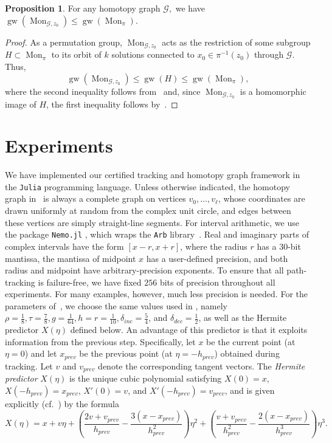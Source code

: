 \documentclass[11pt]{amsart}
\let\oldtextit\textit
\renewcommand\emph[1]{\oldtextit{\color{blue}#1}}
\theoremstyle{definition}
\newtheorem{proposition}[definition]{Proposition}
\theoremstyle{remark}
\DeclareMathOperator{\Mon}{Mon}
\DeclareMathOperator{\gw}{gw}
\begin{document}
\begin{proposition}\label{prop:galois-width}
For any homotopy graph $\mathcal{G},$ we have $\gw (\Mon_{\mathcal{G},z_0} )\le \gw(\Mon_\pi)$.
\end{proposition}
\begin{proof}
As a permutation group, $\Mon_{\mathcal{G},z_0}$ 
acts as the restriction of some subgroup
$H\subset \Mon_\pi$ to its orbit of $k$ solutions connected to $x_0\in\pi^{-1} (z_0)$ through $\mathcal{G}.$
Thus,
$$\gw (\Mon_{\mathcal{G},z_0}) \le \gw (H)\le \gw(\Mon_\pi),$$ where the second inequality follows from~\cite[Theorem 4]{duff2025galois} and, since $\Mon_{\mathcal{G},z_0}$ is a homomorphic image of $H$, the first inequality follows by~\cite[Proposition 3]{duff2025galois}.
\end{proof}



\section{Experiments}\label{sec:experiments}

We have implemented our certified tracking and homotopy graph framework in the \texttt{Julia} programming language. 
Unless otherwise indicated, the homotopy graph in~ is always a complete graph on vertices $v_0, \dots , v_\ell $, whose coordinates are drawn uniformly at random from the complex unit circle, and edges between these vertices are simply straight-line segments.
For interval arithmetic, we use the package \texttt{Nemo.jl} \cite{fieker2017nemo}, which wraps the \texttt{Arb} library~\cite{johansson2017arb}. 
Real and imaginary parts of complex intervals have the form $[x - r, x + r]$, where the radius $r$ has a $30$-bit mantissa, the mantissa of midpoint $x$ has a user-defined precision, and both radius and midpoint have arbitrary-precision exponents.
To ensure that all path-tracking is failure-free, we have fixed $256$ bits of precision throughout all experiments. For many examples, however, much less precision is needed. 
For the parameters of~, we choose the same values used in \cite{guillemot2024validated}, namely $\rho=\frac{1}{8}, \tau=\frac{7}{8},g=\frac{1}{64},h=r=\frac{1}{10},\delta_{inc}=\frac{5}{4}$, and $\delta_{dec}=\frac{1}{2}$, as well as the Hermite predictor $X(\eta)$ defined below. 
An advantage of this predictor is that it exploits information from the previous step. Specifically, let $x$ be the current point (at $\eta=0$) and let $x_{prev}$ be the previous point (at $\eta=-h_{prev}$) obtained during tracking. Let $v$ and $v_{prev}$ denote the corresponding tangent vectors. The \emph{Hermite predictor} $X(\eta)$ is the unique cubic polynomial satisfying
$X(0)=x$, $X(-h_{prev})=x_{prev}$, $X'(0)=v$, and $X'(-h_{prev})=v_{prev}$, 
and is given explicitly (cf.~\cite[\S 6.2]{guillemot2024validated}) by the formula
\begin{equation}\label{eq:hermite-predictor}
X(\eta)=x+v\eta+\left(\frac{2v+v_{prev}}{h_{prev}}-\frac{3(x-x_{prev})}{h_{prev}^2}\right)\eta^2+\left(\frac{v+v_{prev}}{h_{prev}^2}-\frac{2(x-x_{prev})}{h_{prev}^3}\right)\eta^3.
\end{equation}
\end{document}

